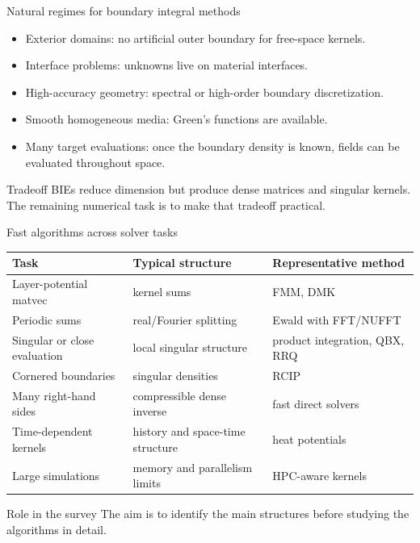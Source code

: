 \documentclass[aspectratio=169,11pt]{beamer}
\begin{document}
\begin{frame}{Natural regimes for boundary integral methods}
\small
\begin{itemize}
  \item Exterior domains: no artificial outer boundary for free-space kernels.
  \item Interface problems: unknowns live on material interfaces.
  \item High-accuracy geometry: spectral or high-order boundary discretization.
  \item Smooth homogeneous media: Green's functions are available.
  \item Many target evaluations: once the boundary density is known, fields
  can be evaluated throughout space.
\end{itemize}

\begin{block}{Tradeoff}
BIEs reduce dimension but produce dense matrices and singular kernels. The
remaining numerical task is to make that tradeoff practical.
\end{block}
\end{frame}

\begin{frame}{Fast algorithms across solver tasks}
\small
\begin{center}
\renewcommand{\arraystretch}{1.18}
\scriptsize
\begin{tabular}{p{}p{}p{}}
\toprule
Task & Typical structure & Representative method \\
\midrule
Layer-potential matvec & kernel sums & FMM, DMK \\
Periodic sums & real/Fourier splitting & Ewald with FFT/NUFFT \\
Singular or close evaluation & local singular structure & product integration, QBX, RRQ \\
Cornered boundaries & singular densities & RCIP \\
Many right-hand sides & compressible dense inverse & fast direct solvers \\
Time-dependent kernels & history and space-time structure & heat potentials \\
Large simulations & memory and parallelism limits & HPC-aware kernels \\
\bottomrule
\end{tabular}
\end{center}

\begin{block}{Role in the survey}
The aim is to identify the main structures before studying the algorithms in
detail.
\end{block}
\end{frame}
\end{document}

